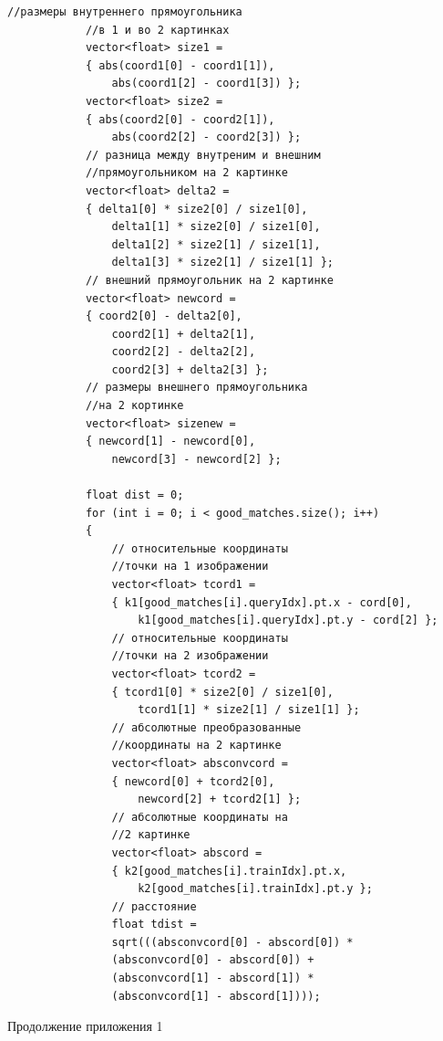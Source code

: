 \documentclass[14pt, a4paper]{extreport}
\begin{document}
\begin{Verbatim}[fontseries=c, fontsize=\fontsize{10pt}{12pt}\selectfont]
			//размеры внутреннего прямоугольника 
			//в 1 и во 2 картинках
			vector<float> size1 = 
			{ abs(coord1[0] - coord1[1]),
				abs(coord1[2] - coord1[3]) };
			vector<float> size2 = 
			{ abs(coord2[0] - coord2[1]),
				abs(coord2[2] - coord2[3]) };
			// разница между внутреним и внешним 
			//прямоугольником на 2 картинке
			vector<float> delta2 = 
			{ delta1[0] * size2[0] / size1[0],
				delta1[1] * size2[0] / size1[0],
				delta1[2] * size2[1] / size1[1],
				delta1[3] * size2[1] / size1[1] };
			// внешний прямоугольник на 2 картинке
			vector<float> newcord = 
			{ coord2[0] - delta2[0],
				coord2[1] + delta2[1],
				coord2[2] - delta2[2],
				coord2[3] + delta2[3] };
			// размеры внешнего прямоугольника 
			//на 2 кортинке
			vector<float> sizenew = 
			{ newcord[1] - newcord[0],
				newcord[3] - newcord[2] };
			
			float dist = 0;
			for (int i = 0; i < good_matches.size(); i++)
			{
				// относительные координаты 
				//точки на 1 изображении
				vector<float> tcord1 = 
				{ k1[good_matches[i].queryIdx].pt.x - cord[0],
					k1[good_matches[i].queryIdx].pt.y - cord[2] };
				// относительные координаты 
				//точки на 2 изображении
				vector<float> tcord2 = 
				{ tcord1[0] * size2[0] / size1[0],
					tcord1[1] * size2[1] / size1[1] };
				// абсолютные преобразованные 
				//координаты на 2 картинке
				vector<float> absconvcord = 
				{ newcord[0] + tcord2[0],
					newcord[2] + tcord2[1] };
				// абсолютные координаты на 
				//2 картинке
				vector<float> abscord =
				{ k2[good_matches[i].trainIdx].pt.x,
					k2[good_matches[i].trainIdx].pt.y };
				// расстояние
				float tdist = 
				sqrt(((absconvcord[0] - abscord[0]) * 
				(absconvcord[0] - abscord[0]) +
				(absconvcord[1] - abscord[1]) *
				(absconvcord[1] - abscord[1])));
\end{Verbatim}
\noindent Продолжение приложения 1
\end{document}
